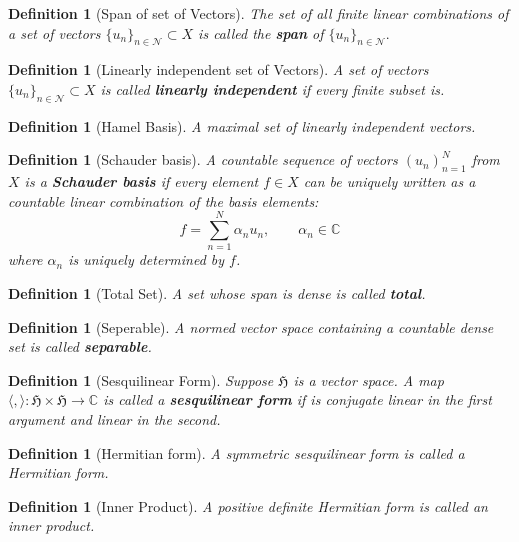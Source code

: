 \documentclass[10pt]{article}
\newtheorem{definition}[]{Definition}
\begin{document}
\begin{definition}[Span of set of Vectors]
    The set of all finite linear combinations of a set of vectors $\{ u_n\}_{n\in\mathcal{N}}\subset X$ is called the \textbf{span} of $\{u_n\}_{n\in\mathcal{N}}.$
\end{definition}

\begin{definition}[Linearly independent set of Vectors]
    A set of vectors $\{ u_n\}_{n\in\mathcal{N}}\subset X$ is called \textbf{linearly independent} if every finite subset is.
\end{definition}

\begin{definition}[Hamel Basis]
    A maximal set of linearly independent vectors.
\end{definition}

\begin{definition}[Schauder basis]
    A countable sequence of vectors $(u_n)_{n=1}^N$ from $X$ is a \textbf{Schauder basis} if every element $f\in X$ can be uniquely written as a countable linear combination of the basis elements:
    \[f=\sum_{n=1}^N\alpha_n u_n,\qquad \alpha_n\in\mathbb{C}\]
    where $\alpha_n$ is uniquely determined by $f$.
\end{definition}

\begin{definition}[Total Set]
    A set whose span is dense is called \textbf{total}.
\end{definition}

\begin{definition}[Seperable]
    A normed vector space containing a countable dense set is called \textbf{separable}.
\end{definition}

\begin{definition}[Sesquilinear Form]
    Suppose $\mathfrak{H}$ is a vector space. A map $\langle,\rangle:\mathfrak{H}\times\mathfrak{H}\to\mathbb{C}$ is called a \textbf{sesquilinear form} if is conjugate linear in the first argument and linear in the second.
\end{definition}

\begin{definition}[Hermitian form]
    A symmetric sesquilinear form is called a Hermitian form.
\end{definition}

\begin{definition}[Inner Product]
    A positive definite Hermitian form is called an inner product.
\end{definition}
\end{document}
